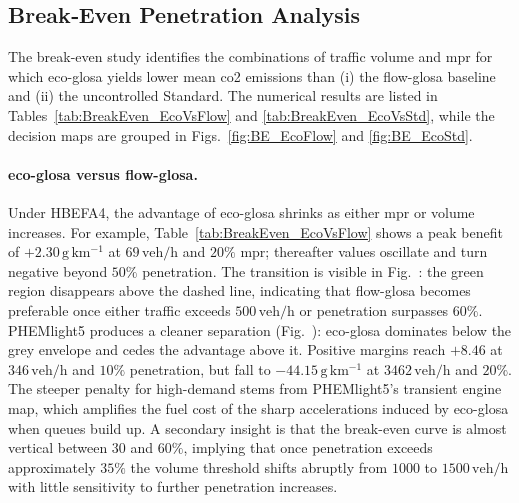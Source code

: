 \subsection{Break‐Even Penetration Analysis}
\label{sec:Results_BreakEven}

The break-even study identifies the combinations of traffic volume and \ac{mpr} for which \ac{eco-glosa} yields lower mean \ac{co2} emissions than (i) the \ac{flow-glosa} baseline and (ii) the uncontrolled Standard. The numerical results are listed in Tables~\ref{tab:BreakEven_EcoVsFlow} and \ref{tab:BreakEven_EcoVsStd}, while the decision maps are grouped in Figs.~\ref{fig:BE_EcoFlow} and \ref{fig:BE_EcoStd}.

\paragraph{\ac{eco-glosa} versus \ac{flow-glosa}.}
Under HBEFA4, the advantage of \ac{eco-glosa} shrinks as either \ac{mpr} or volume increases. For example, Table~\ref{tab:BreakEven_EcoVsFlow} shows a peak benefit of $+2.30\,\mathrm{g\,km^{-1}}$ at $69\,\mathrm{veh/h}$ and $20\%$ \ac{mpr}; thereafter values oscillate and turn negative beyond $50\%$ penetration. The transition is visible in Fig.~: the green region disappears above the dashed line, indicating that \ac{flow-glosa} becomes preferable once either traffic exceeds $500\,\mathrm{veh/h}$ or penetration surpasses $60\%$. 
\mynewline
PHEMlight5 produces a cleaner separation (Fig.~): \ac{eco-glosa} dominates below the grey envelope and cedes the advantage above it. Positive margins reach $+8.46$ at $346\,\mathrm{veh/h}$ and $10\%$ penetration, but fall to $-44.15\,\mathrm{g\,km^{-1}}$ at $3462\,\mathrm{veh/h}$ and $20\%$. The steeper penalty for high-demand stems from PHEMlight5’s transient engine map, which amplifies the fuel cost of the sharp accelerations induced by \ac{eco-glosa} when queues build up. A secondary insight is that the break-even curve is almost vertical between $30$ and $60\%$, implying that once penetration exceeds approximately $35\%$ the volume threshold shifts abruptly from $1000$ to $1500\,\mathrm{veh/h}$ with little sensitivity to further penetration increases.


